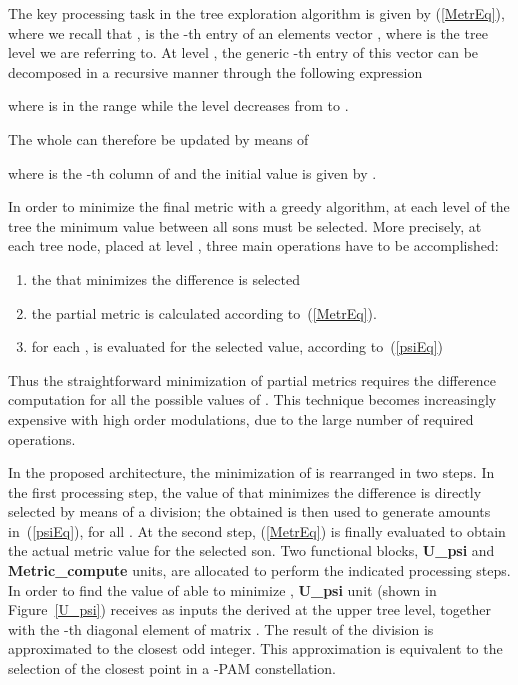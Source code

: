 \documentclass[12pt,onecolumn,draftclsnofoot]{IEEEtran}
\begin{document}
The key processing task in the tree exploration algorithm is given by
(\ref{MetrEq}), where we recall that
,
is the -th entry of an  elements vector 
, where  is the tree level we are referring to. 
At level , the generic -th entry of this vector can be decomposed in a 
recursive manner 
through the following expression

\noindent where  is in the range  while the level  decreases from  to . 

The whole  can therefore be updated by means of 
   
 \noindent where  is the -th column of 
and the initial value is given by                                   .

In order to minimize the
final metric  with a greedy algorithm, at each level of the tree the
minimum  value between all sons must be
selected. More precisely,
at each tree node, placed at level , three main operations have to be accomplished:
\begin{enumerate}
\item the  that minimizes the difference  is selected
\item the partial metric  is calculated according to~(\ref{MetrEq}).
\item for each ,  is evaluated for the selected  value,
according to~(\ref{psiEq})
\end{enumerate}
Thus the straightforward minimization of partial metrics 
requires the difference computation for all
the possible values of . This technique becomes increasingly expensive 
with high order modulations, due to the large number of required
operations. 

In the proposed architecture, the minimization of 
is rearranged in two steps. 
In the first processing step, the value of  that minimizes
the difference  is directly selected by means of a division;
the obtained  is then used to generate  amounts in~(\ref{psiEq}),
for all .
At the second step, 
(\ref{MetrEq}) is finally evaluated  to obtain the actual metric
value  for the selected son.
Two functional blocks, \textbf{U\_psi}
and \textbf{Metric\_compute} units, are allocated to perform the indicated 
processing steps.\\

In order to find the value of  able to
minimize  , \textbf{U\_psi} unit (shown in Figure~\ref{U_psi}) 
receives as inputs the
 derived at the upper tree level, together with the
-th diagonal element of matrix . The result of the division 
 is approximated to the closest odd integer.
This approximation is equivalent to the selection of the closest
point in a -PAM  constellation. 
\end{document}
